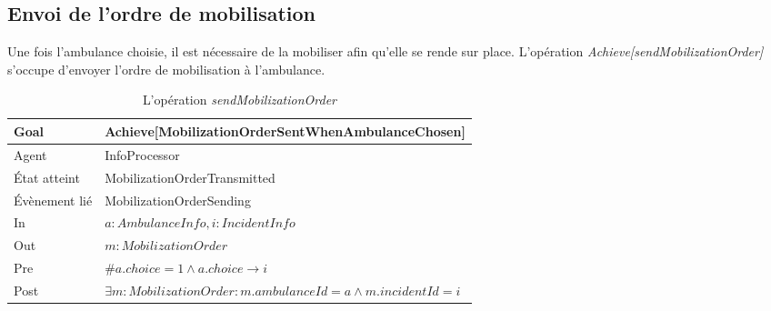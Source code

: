 \newpage
\subsection{Envoi de l'ordre de mobilisation}

	Une fois l'ambulance choisie, il est nécessaire de la mobiliser afin 
	qu'elle se rende sur place. L'opération \textit{Achieve[sendMobilizationOrder]}
	s'occupe d'envoyer l'ordre de mobilisation à l'ambulance.
	
	
	\begin{table}[!h] \centering
		\begin{tabularx}{\textwidth}{|l|X|} \hline
			Goal & Achieve[MobilizationOrderSentWhenAmbulanceChosen] \\ \hline
			Agent & InfoProcessor \\ \hline
			État atteint & MobilizationOrderTransmitted \\ \hline
			Évènement lié & MobilizationOrderSending \\ \hline
			In & $a: AmbulanceInfo, i: IncidentInfo$ \\ \hline
			Out & $m: MobilizationOrder$ \\ \hline
			Pre & $\#a.choice = 1 \wedge a.choice \rightarrow i$ \\ \hline
			Post & $\exists m: MobilizationOrder : m.ambulanceId = a \wedge m.incidentId = i$ \\ \hline 
		\end{tabularx}
		\caption{L'opération \textit{sendMobilizationOrder}}\label{tab:op4}
	\end{table}

